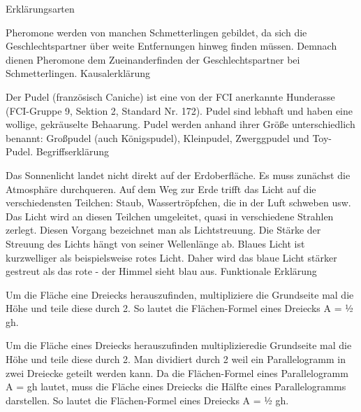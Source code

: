 \begin{mapping}{Erklärungsarten}
    \begin{answer}
        Pheromone werden von manchen Schmetterlingen gebildet, da sich die Geschlechtspartner über weite Entfernungen hinweg finden müssen. Demnach dienen Pheromone dem Zueinanderfinden der Geschlechtspartner bei Schmetterlingen.
        \ismappedto
        Kausalerklärung
    \end{answer}
    \begin{answer}
        Der Pudel (französisch Caniche) ist eine von der FCI anerkannte Hunderasse (FCI-Gruppe 9, Sektion 2, Standard Nr. 172). Pudel sind lebhaft und haben eine wollige, gekräuselte Behaarung. Pudel werden anhand ihrer Größe unterschiedlich benannt: Großpudel (auch Königspudel), Kleinpudel, Zwerggpudel und Toy-Pudel.
        \ismappedto
        Begriffserklärung
    \end{answer}
    \begin{answer}
        Das Sonnenlicht landet nicht direkt auf der Erdoberfläche. Es muss zunächst die Atmosphäre durchqueren. Auf dem Weg zur Erde trifft das Licht auf die verschiedensten Teilchen: Staub, Wassertröpfchen, die in der Luft schweben usw. Das Licht wird an diesen Teilchen umgeleitet, quasi in verschiedene Strahlen zerlegt. Diesen Vorgang bezeichnet man als Lichtstreuung. Die Stärke der Streuung des Lichts hängt von seiner Wellenlänge ab. Blaues Licht ist kurzwelliger als beispielsweise rotes Licht. Daher wird das blaue Licht stärker gestreut als das rote - der Himmel sieht blau aus.
        \ismappedto
        Funktionale Erklärung
    \end{answer}
    \begin{answer}
        Um die Fläche eine Dreiecks herauszufinden, multipliziere die Grundseite mal die Höhe und teile diese durch 2. So lautet die Flächen-Formel eines Dreiecks A = ½ gh.
    \end{answer}
    \begin{answer}
        Um die Fläche eines Dreiecks herauszufinden multiplizieredie Grundseite mal die Höhe und teile diese durch 2. Man dividiert durch 2 weil ein Parallelogramm in zwei Dreiecke geteilt werden kann. Da die Flächen-Formel eines Parallelogramm A = gh lautet, muss die Fläche eines Dreiecks die Hälfte eines Parallelogramms darstellen. So lautet die Flächen-Formel eines Dreiecks A = ½ gh.
    \end{answer}
\end{mapping}

